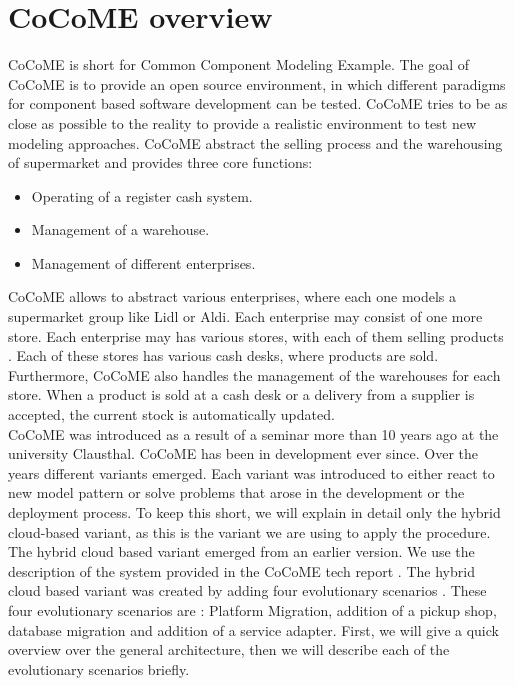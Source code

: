 \section{CoCoME overview}
\label{sec:cocome_overview}
CoCoME is short for Common Component Modeling Example. The goal of CoCoME is to provide an open source environment, in which different paradigms for component based software development can be tested. CoCoME tries to be as close as possible to the reality to provide a realistic environment to test new modeling approaches. %
CoCoME abstract the selling process and the warehousing of supermarket and provides three core functions:
\begin{itemize}
\item Operating of a register cash system.
\item Management of a warehouse.
\item Management of different enterprises.
\end{itemize}
CoCoME allows to abstract various enterprises, where each one models a supermarket group like Lidl or Aldi. Each enterprise may consist of one more store. Each enterprise may has various stores, with each of them selling products . Each of these stores has various cash desks, where products are sold. Furthermore, CoCoME also handles the management of the warehouses for each store. When a product is sold at a cash desk or a delivery from a supplier is accepted, the current stock is automatically updated. \\ CoCoME was introduced as a result of a seminar more than 10 years ago at the university Clausthal. CoCoME has been in development ever since. Over the years different variants emerged. Each variant was introduced to either react to new model pattern or solve problems that arose in the development or the deployment process. To keep this short, we will explain in detail only the hybrid cloud-based variant, as this is the variant we are using to apply the procedure. \\
The hybrid cloud based variant emerged from an earlier version. We use the description of the system provided in the CoCoME tech report \cite{CoCoMETechReport}. The hybrid cloud based variant was created by adding four evolutionary scenarios . These four evolutionary scenarios are : Platform Migration, addition of a pickup shop, database migration and addition of a service adapter. First, we will give a quick overview over the general architecture, then we will describe each of the evolutionary scenarios briefly.\\
